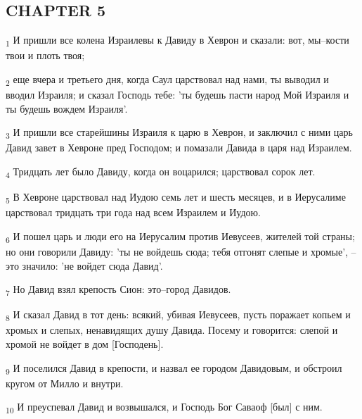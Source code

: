 \subsection{CHAPTER 5}
\begin{tcolorbox}
\textsubscript{1} И пришли все колена Израилевы к Давиду в Хеврон и сказали: вот, мы--кости твои и плоть твоя;
\end{tcolorbox}
\begin{tcolorbox}
\textsubscript{2} еще вчера и третьего дня, когда Саул царствовал над нами, ты выводил и вводил Израиля; и сказал Господь тебе: 'ты будешь пасти народ Мой Израиля и ты будешь вождем Израиля'.
\end{tcolorbox}
\begin{tcolorbox}
\textsubscript{3} И пришли все старейшины Израиля к царю в Хеврон, и заключил с ними царь Давид завет в Хевроне пред Господом; и помазали Давида в царя над Израилем.
\end{tcolorbox}
\begin{tcolorbox}
\textsubscript{4} Тридцать лет было Давиду, когда он воцарился; царствовал сорок лет.
\end{tcolorbox}
\begin{tcolorbox}
\textsubscript{5} В Хевроне царствовал над Иудою семь лет и шесть месяцев, и в Иерусалиме царствовал тридцать три года над всем Израилем и Иудою.
\end{tcolorbox}
\begin{tcolorbox}
\textsubscript{6} И пошел царь и люди его на Иерусалим против Иевусеев, жителей той страны; но они говорили Давиду: 'ты не войдешь сюда; тебя отгонят слепые и хромые', --это значило: 'не войдет сюда Давид'.
\end{tcolorbox}
\begin{tcolorbox}
\textsubscript{7} Но Давид взял крепость Сион: это--город Давидов.
\end{tcolorbox}
\begin{tcolorbox}
\textsubscript{8} И сказал Давид в тот день: всякий, убивая Иевусеев, пусть поражает копьем и хромых и слепых, ненавидящих душу Давида. Посему и говорится: слепой и хромой не войдет в дом [Господень].
\end{tcolorbox}
\begin{tcolorbox}
\textsubscript{9} И поселился Давид в крепости, и назвал ее городом Давидовым, и обстроил кругом от Милло и внутри.
\end{tcolorbox}
\begin{tcolorbox}
\textsubscript{10} И преуспевал Давид и возвышался, и Господь Бог Саваоф [был] с ним.
\end{tcolorbox}
